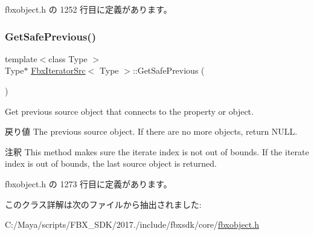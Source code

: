  fbxobject.\+h の 1252 行目に定義があります。

\mbox{\label{class_fbx_iterator_src_adc197165ab59e507a6aa84283c0a821b}} 
\subsubsection{\texorpdfstring{Get\+Safe\+Previous()}{GetSafePrevious()}}
{\footnotesize\ttfamily template$<$class Type $>$ \\
Type$\ast$ \hyperlink{class_fbx_iterator_src}{Fbx\+Iterator\+Src}$<$ Type $>$\+::Get\+Safe\+Previous (\begin{DoxyParamCaption}{ }\end{DoxyParamCaption})\hspace{0.3cm}{\ttfamily [inline]}}

Get previous source object that connects to the property or object. \begin{DoxyReturn}{戻り値}
The previous source object. If there are no more objects, return N\+U\+LL. 
\end{DoxyReturn}
\begin{DoxyRemark}{注釈}
This method makes sure the iterate index is not out of bounds. If the iterate index is out of bounds, the last source object is returned. 
\end{DoxyRemark}


 fbxobject.\+h の 1273 行目に定義があります。



このクラス詳解は次のファイルから抽出されました\+:\begin{DoxyCompactItemize}
\item 
C\+:/\+Maya/scripts/\+F\+B\+X\+\_\+\+S\+D\+K/2017./include/fbxsdk/core/\hyperlink{fbxobject_8h}{fbxobject.\+h}\end{DoxyCompactItemize}
